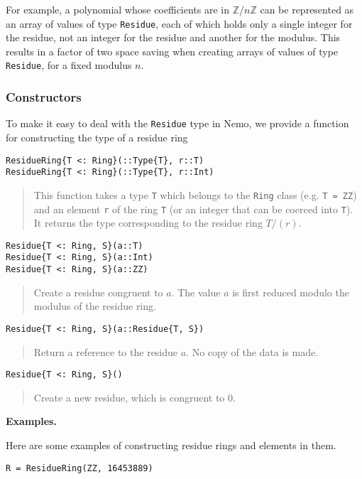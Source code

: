 \documentclass[a4paper,10pt]{article}
\newcommand{\Z}{\mathbb{Z}}
\newcommand{\code}{\lstinline}
\newcommand{\desc}[1]{\vspace{-3mm}\begin{quote}#1\end{quote}}
\begin{document}
{{{For example, a polynomial whose coefficients are in $\Z/n\Z$ can be 
represented as an array of values of type \code{Residue}, each of which holds
only a single integer for the residue, not an integer for the residue and
another for the modulus. This results in a factor of two space saving when
creating arrays of values of type \code{Residue}, for a fixed modulus $n$.

\subsubsection{Constructors}

To make it easy to deal with the \code{Residue} type in Nemo, we provide a
function for constructing the type of a residue ring

\begin{lstlisting}
ResidueRing{T <: Ring}(::Type{T}, r::T)
ResidueRing{T <: Ring}(::Type{T}, r::Int)
\end{lstlisting}

\desc{This function takes a type \code{T} which belongs to the \code{Ring}
class (e.g. \code{T = ZZ}) and an element \code{r} of the ring \code{T} (or
an integer that can be coerced into \code{T}). It returns the type 
corresponding to the residue ring $T/(r)$.}

\begin{lstlisting}
Residue{T <: Ring, S}(a::T)
Residue{T <: Ring, S}(a::Int)  
Residue{T <: Ring, S}(a::ZZ)  
\end{lstlisting}

\desc{Create a residue congruent to $a$. The value $a$ is first reduced
modulo the modulus of the residue ring.}

\begin{lstlisting}
Residue{T <: Ring, S}(a::Residue{T, S})  
\end{lstlisting}

\desc{Return a reference to the residue $a$. No copy of the data is made.}

\begin{lstlisting}
Residue{T <: Ring, S}()
\end{lstlisting}

\desc{Create a new residue, which is congruent to $0$.}

\textbf{Examples.}

Here are some examples of constructing residue rings and elements in them.

\begin{lstlisting}
R = ResidueRing(ZZ, 16453889)


\end{lstlisting}}}}
\end{document}
